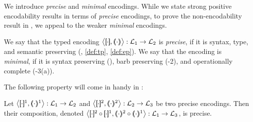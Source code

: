 \documentclass[runningheads]{llncs}
\begin{document}
{{We introduce 
\emph{precise} and \emph{minimal}
 encodings.
While we state strong positive encodability results %
in terms of {\em precise} encodings,
to prove the non-encodability result in , 
we appeal to the weaker {\em minimal} encodings.  

\begin{definition}%
\label{def:goodenc}
We say that 
	the typed encoding 
	$\enco{\map{\cdot}, \mapt{\cdot} %
	}: \tyl{L}_1 \to \tyl{L}_2$ is 
	\emph{precise}, if it is syntax, type, and semantic preserving (, \ref{def:tp}, \ref{def:ep}).
	We say that the encoding is
	\emph{minimal}, if it is syntax preserving 
	(),
	barb preserving (-2), 
	and operationally complete (-3(a)).
\end{definition}




The following property will come in handy in :

\begin{proposition}%
	\label{pro:composition}
	Let %
	$\enco{\map{\cdot}^{1}, \mapt{\cdot}^{1}%
	}: \tyl{L}_1 \to \tyl{L}_2$
	and 
	$\enco{\map{\cdot}^{2}, \mapt{\cdot}^{2}%
	}: \tyl{L}_2 \to \tyl{L}_3$
	be two precise %
	encodings.
	Then their composition, denoted 
	$\enco{\map{\cdot}^{2} \circ \map{\cdot}^{1}, \mapt{\cdot}^{2} \circ \mapt{\cdot}^{1} %
	}: \tyl{L}_1 \to \tyl{L}_3$,
	is precise. 
\end{proposition}


}}
\end{document}
